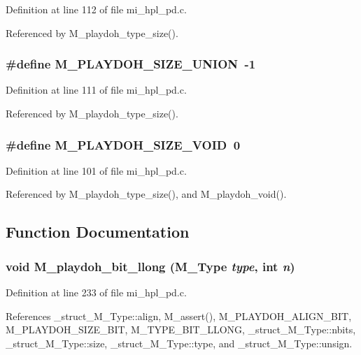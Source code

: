 Definition at line 112 of file mi\_\-hpl\_\-pd.c.

Referenced by M\_\-playdoh\_\-type\_\-size().
\subsubsection{\setlength{\rightskip}{0pt plus 5cm}\#define M\_\-PLAYDOH\_\-SIZE\_\-UNION~-1}\label{mi__hpl__pd_8c_e40af03c885b0cf303f353cec1b08ccb}




Definition at line 111 of file mi\_\-hpl\_\-pd.c.

Referenced by M\_\-playdoh\_\-type\_\-size().
\subsubsection{\setlength{\rightskip}{0pt plus 5cm}\#define M\_\-PLAYDOH\_\-SIZE\_\-VOID~0}\label{mi__hpl__pd_8c_3eac43ed02569d47d467404d7da5964e}




Definition at line 101 of file mi\_\-hpl\_\-pd.c.

Referenced by M\_\-playdoh\_\-type\_\-size(), and M\_\-playdoh\_\-void().

\subsection{Function Documentation}
\subsubsection{\setlength{\rightskip}{0pt plus 5cm}void M\_\-playdoh\_\-bit\_\-llong (\bf{M\_\-Type} {\em type}, int {\em n})}\label{mi__hpl__pd_8c_887029376932df4ad6558b699f7a78d6}




Definition at line 233 of file mi\_\-hpl\_\-pd.c.

References \_\-struct\_\-M\_\-Type::align, M\_\-assert(), M\_\-PLAYDOH\_\-ALIGN\_\-BIT, M\_\-PLAYDOH\_\-SIZE\_\-BIT, M\_\-TYPE\_\-BIT\_\-LLONG, \_\-struct\_\-M\_\-Type::nbits, \_\-struct\_\-M\_\-Type::size, \_\-struct\_\-M\_\-Type::type, and \_\-struct\_\-M\_\-Type::unsign.

